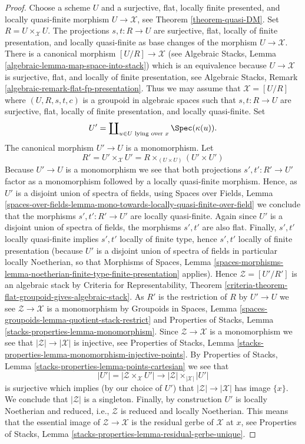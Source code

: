 \begin{proof}
Choose a scheme $U$ and a surjective, flat, locally finite presented,
and locally quasi-finite morphism $U \to \mathcal{X}$, see
Theorem \ref{theorem-quasi-DM}.
Set $R = U \times_\mathcal{X} U$. The projections $s, t : R \to U$
are surjective, flat, locally of finite presentation, and
locally quasi-finite as base changes of the morphism $U \to \mathcal{X}$.
There is a canonical morphism $[U/R] \to \mathcal{X}$ (see
Algebraic Stacks, Lemma \ref{algebraic-lemma-map-space-into-stack})
which is an equivalence because $U \to \mathcal{X}$ is surjective, flat,
and locally of finite presentation, see
Algebraic Stacks, Remark \ref{algebraic-remark-flat-fp-presentation}.
Thus we may assume that $\mathcal{X} = [U/R]$ where
$(U, R, s, t, c)$ is a groupoid in algebraic spaces such that
$s, t : R \to U$ are surjective, flat, locally of finite presentation,
and locally quasi-finite. Set
$$
U' = \coprod\nolimits_{u \in U\text{ lying over }x} \Spec(\kappa(u)).
$$
The canonical morphism $U' \to U$ is a monomorphism. Let
$$
R' = U' \times_\mathcal{X} U' =
R \times_{(U \times U)} (U' \times U')
$$
Because $U' \to U$ is a monomorphism we see that both projections
$s', t' : R' \to U'$ factor as a monomorphism followed by a locally
quasi-finite morphism. Hence, as $U'$ is a disjoint union of spectra
of fields, using
Spaces over Fields, Lemma
\ref{spaces-over-fields-lemma-mono-towards-locally-quasi-finite-over-field}
we conclude that the morphisms $s', t' : R' \to U'$ are locally quasi-finite.
Again since $U'$ is a disjoint union of spectra of fields, the morphisms
$s', t'$ are also flat. Finally, $s', t'$ locally quasi-finite
implies $s', t'$ locally of finite type, hence $s', t'$ locally of finite
presentation (because $U'$ is a disjoint union of spectra of fields
in particular locally Noetherian, so that
Morphisms of Spaces, Lemma
\ref{spaces-morphisms-lemma-noetherian-finite-type-finite-presentation}
applies). Hence $\mathcal{Z} = [U'/R']$ is an algebraic stack by
Criteria for Representability, Theorem
\ref{criteria-theorem-flat-groupoid-gives-algebraic-stack}.
As $R'$ is the restriction of $R$ by $U' \to U$ we see
$\mathcal{Z} \to \mathcal{X}$ is a monomorphism by
Groupoids in Spaces, Lemma
\ref{spaces-groupoids-lemma-quotient-stack-restrict}
and
Properties of Stacks, Lemma \ref{stacks-properties-lemma-monomorphism}.
Since $\mathcal{Z} \to \mathcal{X}$ is a monomorphism we see that
$|\mathcal{Z}| \to |\mathcal{X}|$ is injective, see
Properties of Stacks, Lemma
\ref{stacks-properties-lemma-monomorphism-injective-points}.
By
Properties of Stacks, Lemma \ref{stacks-properties-lemma-points-cartesian}
we see that
$$
|U'| = |\mathcal{Z} \times_\mathcal{X} U'|
\longrightarrow
|\mathcal{Z}| \times_{|\mathcal{X}|} |U'|
$$
is surjective which implies (by our choice of $U'$) that
$|\mathcal{Z}| \to |\mathcal{X}|$ has image $\{x\}$.
We conclude that $|\mathcal{Z}|$ is a singleton.
Finally, by construction $U'$ is locally Noetherian and reduced, i.e.,
$\mathcal{Z}$ is reduced and locally Noetherian. This means that
the essential image of $\mathcal{Z} \to \mathcal{X}$
is the residual gerbe of $\mathcal{X}$ at $x$, see
Properties of Stacks, Lemma
\ref{stacks-properties-lemma-residual-gerbe-unique}.
\end{proof}
